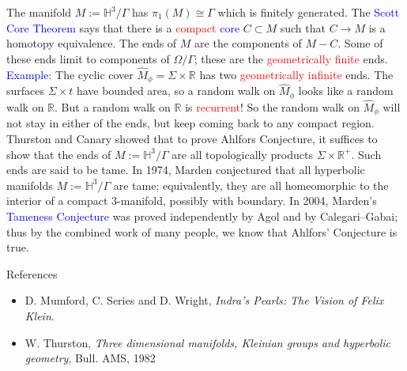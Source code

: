 \documentclass{beamer}
\def\R{\mathbb{R}}
\def\H{\mathbb{H}}
\begin{document}
\frame
{
The manifold $M:=\H^3/\Gamma$ has $\pi_1(M)\cong\Gamma$ which is finitely generated.
\vskip 10pt
The \textcolor{blue}{Scott Core Theorem} says that there is a \textcolor{red}{compact}
\textcolor{blue}{core}
$C \subset M$ such that $C \to M$ is a homotopy equivalence.
\vskip 10pt
The \textcolor{dgreen}{ends} of $M$ are the components of $M-C$.
\vskip 10pt
Some of these ends limit to components of $\Omega/\Gamma$; these are the 
\textcolor{red}{geometrically finite} ends.
}
\frame
{
\textcolor{blue}{Example:} The cyclic cover $\widehat{M}_\phi=\Sigma \times \R$ has two \textcolor{red}{geometrically
infinite} ends. The surfaces $\Sigma \times t$ have bounded area, 
so a random walk on $\widehat{M}_\phi$ looks like a random walk on $\R$.
\vskip 10pt
But a random walk on $\R$ is \textcolor{red}{recurrent}! So the random walk on $\widehat{M}_\phi$ will not
stay in either of the ends, but keep coming back to any compact region.
}
\frame
{
Thurston and Canary showed that to prove Ahlfors Conjecture, it suffices to show that the
ends of $M:=\H^3/\Gamma$ are all topologically products $\Sigma \times \R^+$. Such ends
are said to be \textcolor{dgreen}{tame}.
\vskip 10pt
In 1974, Marden conjectured that all hyperbolic manifolds $M:=\H^3/\Gamma$ are 
\textcolor{dgreen}{tame}; equivalently, they are all homeomorphic to the interior of a
compact 3-manifold, possibly with boundary.
\vskip 10pt
In 2004, Marden's \textcolor{blue}{Tameness Conjecture} was proved independently by
Agol and by Calegari--Gabai; thus by the combined work of many people,
we know that Ahlfors' Conjecture is true.
}
\frame
{
\begin{block}{References}
\begin{itemize}
\item{D. Mumford, C. Series and D. Wright, {\em Indra's Pearls: The Vision of Felix Klein}.}
\item{W. Thurston, {\em Three dimensional manifolds, Kleinian groups and hyperbolic geometry},
Bull. AMS, 1982}
\end{itemize}
\end{block}
}
\end{document}
